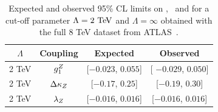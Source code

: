 \begin{table}\centering 
\begin{tabular}{cccc}
\hline
 $\Lambda$ & Coupling & Expected  & Observed \\
\hline
2 TeV 	& $g_1^Z$ 		& [$-0.023$, $0.055$]  & [ $-0.029$, $0.050$] \\
2 TeV 	& $\Delta \kappa_Z$ 	& [$-0.17$, $0.25$]    & [$-0.19$, $0.30$] \\
2 TeV 	& $\lambda_Z$ 	& [$-0.016$, $0.016$]  & [$-0.016$, $0.016$] \\
\hline
\end{tabular}
\caption{Expected and observed 95\% CL limits on \dkz, \lz\ and \gz\; for a cut-off parameter $\Lambda = 2\TeV$ and $\Lambda = \infty$ obtained with the full 8 TeV dataset from ATLAS~\cite{Aad:2016ett}.}
 \label{tab:sss-WZprod-ATGC}
\end{table}
 










